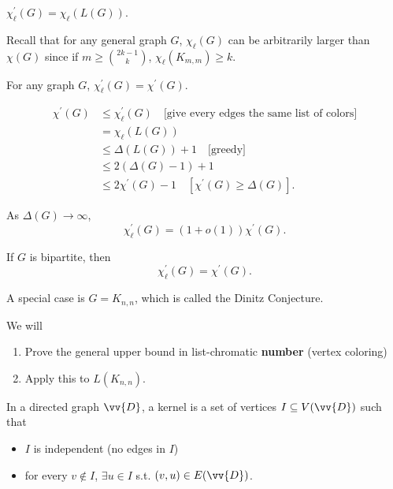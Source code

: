 \begin{remark}
    \(\chi _\ell ^{\prime} (G) = \chi _\ell (L(G))\). 
\end{remark}

Recall that for any general graph \(G\), \(\chi _\ell (G)\) can be arbitrarily larger than \(\chi (G)\) since if \(m \ge \binom{2k - 1}{k}\), \(\chi _\ell (K_{m, m}) \ge k\).

\begin{conjecture}
    For any graph \(G\), \(\chi _\ell ^{\prime} (G) = \chi ^{\prime} (G)\).  
\end{conjecture}

\begin{observation}
    \begin{align*}
        \chi ^{\prime} (G) &\le \chi _\ell ^{\prime} (G) \quad \text{[give every edges the same list of colors]}  \\
        &= \chi _\ell (L(G)) \\
        &\le \Delta (L(G)) + 1  \quad \text{[greedy]} \\
        &\le 2 \left( \Delta (G) - 1 \right) + 1 \\
        &\le 2 \chi ^{\prime} (G) - 1 \quad [\chi ^{\prime} (G) \ge \Delta (G)] . 
    \end{align*}
\end{observation}

\begin{theorem}[Kahn, 1996]
    As \(\Delta(G) \to \infty \), 
    \[
        \chi _\ell ^{\prime} (G) = (1 + o(1)) \chi ^{\prime} (G).
    \] 
\end{theorem}

\begin{theorem}[Galvin, 1995]
    If \(G\) is bipartite, then
    \[
        \chi _\ell ^{\prime} (G) = \chi ^{\prime} (G).
    \] 
\end{theorem}

A special case is \(G = K_{n, n}\), which is called the Dinitz Conjecture. 

We will 
\begin{enumerate}
    \item Prove the general upper bound in list-chromatic \textbf{number} (vertex coloring) 
    \item Apply this to \(L(K_{n, n})\). 
\end{enumerate}

\begin{definition}
    In a directed graph \(\vv{D}\), a kernel is a set of vertices \(I \subseteq V(\vv{D})\) such that 
    \begin{itemize}
        \item \(I\) is independent (no edges in \(I\))
        \item for every \(v \notin I\), \(\exists u \in I\) s.t. \((v, u) \in E(\vv{D}) \).    
    \end{itemize}  
\end{definition}

